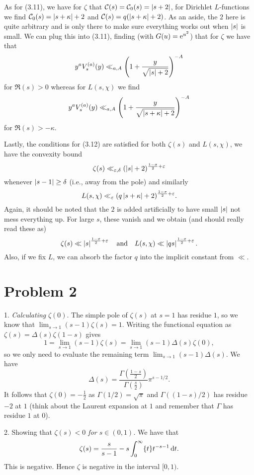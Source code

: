 \documentclass[a4paper,11pt]{article}
\begin{document}
As for (3.11), we have for $\zeta$ that $\mathcal C(s) = \mathcal{C}_0(s) = \left\lvert s+2 \right\rvert$, 
for Dirichlet $L$-functions we find $\mathcal{C}_0(s) = \left\lvert s + \kappa \right\rvert + 2$ and
$\mathcal{C}(s) = q(\left\lvert s + \kappa \right\rvert + 2)$. As an aside, the $2$ here is quite arbitrary 
and is only there to make sure everything works out when $\left\lvert s \right\rvert$ is small. 
We can plug this into (3.11), finding (with $G(u) = \mathrm e^{u^2}$) that for $\zeta$
we have that
\[
    y^aV_s^{(a)}(y) \ll_{a,A} \left(1 + \frac{y}{\sqrt{\left\lvert s \right\rvert +2}} \right)^{-A}
\]
for $\Re(s) > 0$ whereas for $L(s, \chi)$ we find
\[
    y^aV_s^{(a)}(y) \ll_{a,A} \left(1 + \frac{y}{\sqrt{\left\lvert s+\kappa \right\rvert +2}}
    \right)^{-A}
\]
for $\Re(s) > -\kappa$. 

Lastly, the conditions for (3.12) are satisfied for both $\zeta(s)$ and $L(s,\chi)$, 
we have the convexity bound
\[
    \zeta(s) \ll_{\varepsilon, \delta} (\left\lvert s \right\rvert + 2)^{\frac{1-\sigma}2+\varepsilon}
\]
whenever $\left\lvert s-1 \right\rvert \geq \delta$ (i.e., away from the pole) and similarly
\[
    L(s,\chi) \ll_\varepsilon (q\left\lvert s+\kappa \right\rvert+2)^{\frac{1-\sigma}2 + \varepsilon}. 
\]
Again, it should be noted that the $2$ is added artificially to have 
small $\left\lvert s \right\rvert$ not mess everything up. For large $s$, these vanish and we obtain 
(and should really read these as)
\[
    \zeta(s) \ll \left\lvert s \right\rvert ^{\frac{1-\sigma}2+\varepsilon} \quad \text{and}
    \quad  L(s, \chi) \ll \left\lvert qs \right\rvert^{\frac{1-\sigma}2 + \varepsilon}. 
\]
Also, if we fix $L$, we can absorb the factor $q$ into the implicit constant 
from $\ll$. 



\section*{Problem 2}
1. \textit{Calculating }$\zeta(0)$. The simple pole of $\zeta(s)$ at $s=1$ has
residue $1$, so we know that 
$\lim_{s \to 1} (s-1) \zeta(s) = 1$. Writing the functional equation as
$\zeta(s) = \Delta(s) \zeta(1-s)$ 
gives 
\[
    1 = \lim_{s \to 1} (s-1) \zeta(s) = \lim_{s \to 1} (s-1) \Delta(s) \zeta(0),
\]
so we only need to evaluate the remaining term $\lim_{s \to 1}(s-1) \Delta(s)$.
We have 
$$\Delta(s) = \frac{\Gamma(\frac{1-s}2)}{\Gamma(\frac s2)} \pi^{s-1/2}.$$
It follows that $\zeta(0) = -\frac 12$ as $\Gamma(1/2) = \sqrt \pi$ and 
$\Gamma((1-s)/2)$ has residue $-2$ at $1$ (think about the Laurent expansion at $1$
and remember that $\Gamma$ has residue $1$ at $0$). 

2. Showing that \textit{$\zeta(s) < 0$ for $s \in (0,1)$.} We have that 
\[
    \zeta(s) = \frac{s}{s-1} - s \int_0^\infty \{t\} t^{-s-1} \mathrm{\,d} t.
\]
This is negative. Hence $\zeta$ is negative in the interval $[0,1)$. 
\end{document}
